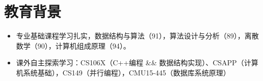 \documentclass{resume}
\begin{document}




\sepspace


\section{教育背景}
\begin{itemize}
  \item 专业基础课程学习扎实，数据结构与算法（91），算法设计与分析（89），离散数学（90），计算机组成原理（94）。 
  \item 课外自主探索学习：CS106X（C++编程 \&\& 数据结构实现）、CSAPP（计算机系统基础），CS149（并行编程），CMU15-445（数据库系统原理）
\end{itemize}
\end{document}
